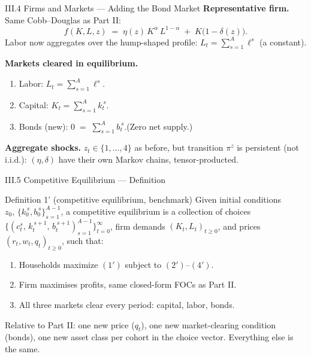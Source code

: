 \documentclass[aspectratio=169,11pt]{beamer}
\newcommand{\emphc}[1]{\textcolor{harvardcrimson}{#1}}
\begin{document}
\begin{frame}{III.4 Firms and Markets --- Adding the Bond Market}
\small
\textbf{Representative firm.}  Same Cobb--Douglas as Part II:
\[
f(K, L, z) \;=\; \eta(z)\, K^{\alpha}\, L^{1-\alpha} \;+\; K\bigl(1-\delta(z)\bigr).
\]
Labor now aggregates over the hump-shaped profile: $L_t = \sum_{s=1}^{A} \ell^s$ (a constant).

\vspace{0.5em}
\textbf{Markets cleared in equilibrium.}
\begin{enumerate}\itemsep2pt
    \item Labor: $L_t = \sum_{s=1}^{A} \ell^s$.
    \item Capital: $K_t = \sum_{s=1}^{A} k_t^{\,s}$.
    \item \emphc{Bonds (new): $\displaystyle 0 \;=\; \sum_{s=1}^{A} b_t^{\,s}.$}\quad (Zero net supply.)
\end{enumerate}

\vspace{0.3em}
\textbf{Aggregate shocks.}  $z_t \in \{1,\ldots,4\}$ as before, but transition $\pi^z$ is \emphc{persistent} (not i.i.d.): $(\eta, \delta)$ have their own Markov chains, tensor-producted.
\end{frame}


\begin{frame}{III.5 Competitive Equilibrium --- Definition}
\small
\begin{block}{Definition 1' (competitive equilibrium, benchmark)}
Given initial conditions $z_0,\, \{k_0^{\,s}, b_0^{\,s}\}_{s=1}^{A-1}$, a competitive equilibrium is
a collection of choices $\bigl\{(c_t^s,\,k_t^{\,s+1},\,b_t^{\,s+1})_{s=1}^{A-1}\bigr\}_{t=0}^\infty$,
firm demands $(K_t, L_t)_{t \ge 0}$, and prices $(r_t, w_t, q_t)_{t\ge 0}$, such that:
\begin{enumerate}\itemsep1pt
    \item Households maximize $(1')$ subject to $(2')$--$(4')$.
    \item Firm maximises profits, same closed-form FOCs as Part II.
    \item \emphc{All three markets clear} every period: capital, labor, \emphc{bonds}.
\end{enumerate}
\end{block}

\vspace{0.3em}
{\footnotesize Relative to Part II: one new price ($q_t$), one new market-clearing condition (bonds), one new asset class per cohort in the choice vector.  Everything else is the same.}
\end{frame}
\end{document}

